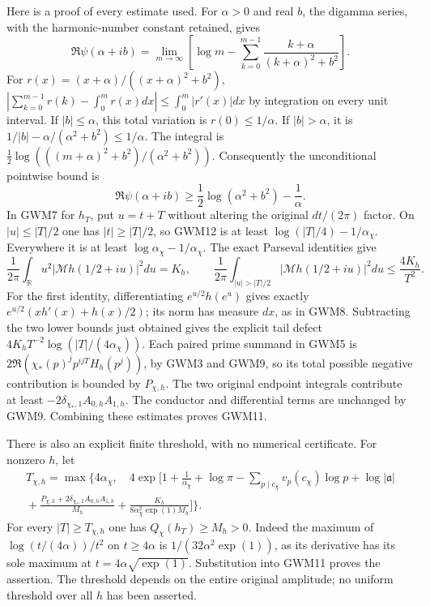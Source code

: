 Here is a proof of every estimate used. For $\alpha>0$ and real $b$,
the digamma series, with the harmonic-number constant retained, gives
\[
 \Re\psi(\alpha+ib)=
 \lim_{m\to\infty}\left[\log m-
 \sum_{k=0}^{m-1}\frac{k+\alpha}{(k+\alpha)^2+b^2}\right].
\]
For $r(x)=(x+\alpha)/((x+\alpha)^2+b^2)$,
$|\sum_{k=0}^{m-1}r(k)-\int_0^m r(x)dx|
\le\int_0^m|r'(x)|dx$ by integration on every unit interval.
If $|b|\le\alpha$, this total variation is $r(0)\le1/\alpha$.
If $|b|>\alpha$, it is
$1/|b|-\alpha/(\alpha^2+b^2)\le1/\alpha$.
The integral is
$\tfrac12\log(((m+\alpha)^2+b^2)/(\alpha^2+b^2))$.
Consequently the unconditional pointwise bound is
\begin{equation}\tag{GWM12}
 \Re\psi(\alpha+ib)\ge
 \frac12\log(\alpha^2+b^2)-\frac1\alpha.
\end{equation}
In GWM7 for $h_T$, put $u=t+T$ without altering the original $dt/(2\pi)$
factor. On $|u|\le|T|/2$ one has $|t|\ge|T|/2$, so GWM12 is at least
$\log(|T|/4)-1/\alpha_\chi$. Everywhere it is at least
$\log\alpha_\chi-1/\alpha_\chi$. The exact Parseval identities give
\begin{equation}\tag{GWM13}
 \frac1{2\pi}\int_{\mathbb R}u^2|\mathcal Mh(1/2+iu)|^2du=K_h,
 \qquad
 \frac1{2\pi}\int_{|u|>|T|/2}|\mathcal Mh(1/2+iu)|^2du
 \le\frac{4K_h}{T^2}.
\end{equation}
For the first identity, differentiating $e^{u/2}h(e^u)$ gives exactly
$e^{u/2}(xh'(x)+h(x)/2)$; its norm has measure $dx$, as in GWM8.
Subtracting the two lower bounds just obtained gives the explicit
tail defect $4K_h T^{-2}\log(|T|/(4\alpha_\chi))$.
Each paired prime summand in GWM5 is
$2\Re(\chi_*(p)^j p^{ijT}H_h(p^j))$, by GWM3 and GWM9,
so its total possible negative contribution is bounded by $P_{\chi,h}$.
The two original endpoint integrals contribute at least
$-2\delta_{\chi_*,1}A_{0,h}A_{1,h}$. The conductor and differential
terms are unchanged by GWM9. Combining these estimates proves GWM11.

There is also an explicit finite threshold, with no numerical certificate.
For nonzero $h$, let
\begin{equation}\tag{GWM14}
 \begin{split}
 T_{\chi,h}=\max\Biggl\{4\alpha_\chi,\quad4\exp\Biggl[
 1+\frac1{\alpha_\chi}+\log\pi
 -\sum_{p\mid c_\chi}v_p(c_\chi)\log p+\log|\mathfrak a|\\
 {}+\frac{P_{\chi,h}+2\delta_{\chi_*,1}A_{0,h}A_{1,h}}{M_h}
 +\frac{K_h}{8\alpha_\chi^2\exp(1)M_h}
 \Biggr]\Biggr\}.
 \end{split}
\end{equation}
For every $|T|\ge T_{\chi,h}$ one has $Q_\chi(h_T)\ge M_h>0$.
Indeed the maximum of $\log(t/(4\alpha))/t^2$ on $t\ge4\alpha$
is $1/(32\alpha^2\exp(1))$, as its derivative has its sole maximum
at $t=4\alpha\sqrt{\exp(1)}$. Substitution into GWM11 proves the
assertion. The threshold depends on the entire original amplitude;
no uniform threshold over all $h$ has been asserted.

